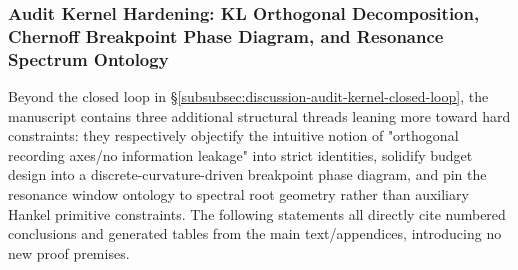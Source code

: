 
\subsubsection{Audit Kernel Hardening: KL Orthogonal Decomposition, Chernoff Breakpoint Phase Diagram, and Resonance Spectrum Ontology}\label{subsubsec:discussion-audit-kernel-hardening-kl-chernoff-resonance}
Beyond the closed loop in \S\ref{subsubsec:discussion-audit-kernel-closed-loop}, the manuscript contains three additional structural threads leaning more toward hard constraints:
they respectively objectify the intuitive notion of "orthogonal recording axes/no information leakage" into strict identities, solidify budget design into a discrete-curvature-driven breakpoint phase diagram, and pin the resonance window ontology to spectral root geometry rather than auxiliary Hankel primitive constraints.
The following statements all directly cite numbered conclusions and generated tables from the main text/appendices, introducing no new proof premises.

